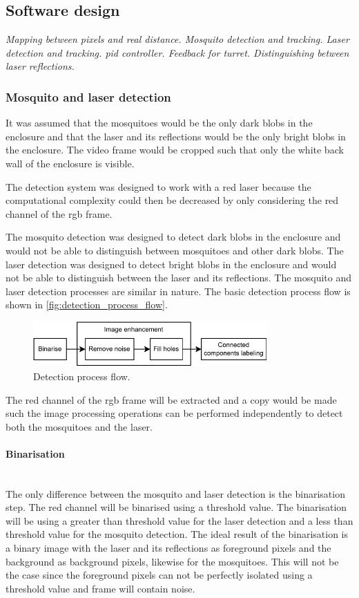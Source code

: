 \subsection{Software design}
\textit{Mapping between pixels and real distance. Mosquito detection and tracking. Laser detection and tracking. \gls{pid} controller. Feedback for turret. Distinguishing between laser reflections.}



\subsubsection{Mosquito and laser detection} \label{subsubsec:mosquito_and_laser_detection}
It was assumed that the mosquitoes would be the only dark blobs in the enclosure and that the laser and its reflections would be the only bright blobs in the enclosure. The video frame would be cropped such that only the white back wall of the enclosure is visible.

The detection system was designed to work with a red laser because the computational complexity could then be decreased by only considering the red channel of the \gls{rgb} frame.

The mosquito detection was designed to detect dark blobs in the enclosure and would not be able to distinguish between mosquitoes and other dark blobs. The laser detection was designed to detect bright blobs in the enclosure and would not be able to distinguish between the laser and its reflections. The mosquito and laser detection processes are similar in nature. The basic detection process flow is shown in \autoref{fig:detection_process_flow}.
\begin{figure}[h]
    \centering
    \includegraphics[width=0.8\textwidth]{figures/detection/detection_process_flow.pdf}
    \caption{Detection process flow.}
    \label{fig:detection_process_flow}
\end{figure}
The red channel of the \gls{rgb} frame will be extracted and a copy would be made such the image processing operations can be performed independently to detect both the mosquitoes and the laser.


\paragraph{Binarisation}\mbox{}\\
The only difference between the mosquito and laser detection is the binarisation step. The red channel will be binarised using a threshold value. The binarisation will be using a greater than threshold value for the laser detection and a less than threshold value for the mosquito detection. The ideal result of the binarisation is a binary image with the laser and its reflections as foreground pixels and the background as background pixels, likewise for the mosquitoes. This will not be the case since the foreground pixels can not be perfectly isolated using a threshold value and frame will contain noise.


